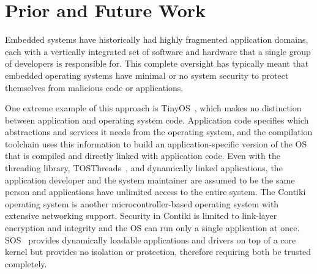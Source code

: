 \section{Prior and Future Work}

Embedded systems have historically had highly fragmented application domains,
each with a vertically integrated set of software and hardware
that a single group of developers
is responsible for.
This complete oversight has typically meant
that embedded operating systems have
minimal or no system security to protect themselves from malicious code
or applications.

One extreme example of this approach is TinyOS~\cite{tinyos}, which makes no
distinction between application and operating system code. Application
code specifies which abstractions and services it needs from the
operating system, and the compilation toolchain uses this information
to build an application-specific version of the OS that is compiled
and directly linked with application code.
Even with the threading library, TOSThreads~\cite{tosthreads}, and
dynamically linked applications, the
application
developer and the system maintainer are assumed to be the same person
and applications
have unlimited access to the entire system.
The Contiki~\cite{contiki} operating system is another microcontroller-based
operating system
with extensive networking support. Security in Contiki is limited to
link-layer encryption and integrity and the OS can run only a single
application at once. SOS~\cite{han05sos}
provides dynamically loadable applications  and drivers on top of a
core kernel but provides no isolation or protection, therefore requiring 
both be trusted completely.


